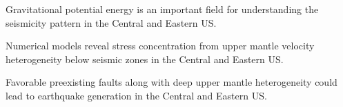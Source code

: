 \documentclass[draft,linenumbers]{agujournal2018}
\begin{document}



\begin{keypoints}
\item Gravitational potential energy is an important field for understanding the seismicity pattern in the Central and Eastern US.
\item Numerical models reveal stress concentration from upper mantle velocity heterogeneity below seismic zones in the Central and Eastern US.
\item Favorable preexisting faults along with deep upper mantle  heterogeneity could lead to earthquake generation in the Central and Eastern US.
\end{keypoints}

%
%

\end{document}
